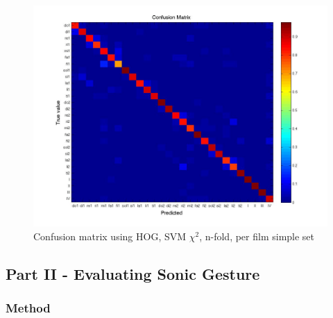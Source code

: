 \begin{figure}[tb]
	\centering{}
	\includegraphics[width=\linewidth]{confmat/confusion.jpg}
	\caption{Confusion matrix using HOG, SVM $\chi^2$, n-fold, per film simple set}
	\label{fig:confusion}
\end{figure}




\subsection{Part II - Evaluating Sonic Gesture}

\subsubsection{Method}

